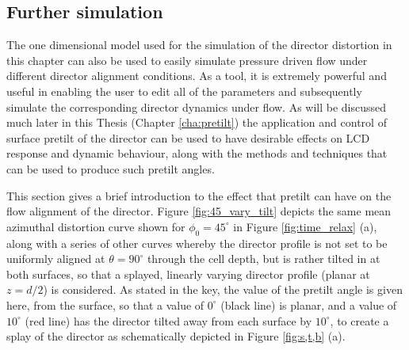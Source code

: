 \subsection{Further simulation}
\label{sec:45_vary_tilt}
The one dimensional model used for the simulation of the director distortion in this chapter can also be used to easily simulate pressure driven flow under different director alignment conditions. As a tool, it is extremely powerful and useful in enabling the user to edit all of the parameters and subsequently simulate the corresponding director dynamics under flow. As will be discussed much later in this Thesis (Chapter \ref{cha:pretilt}) the application and control of surface pretilt of the director can be used to have desirable effects on LCD response and dynamic behaviour, along with the methods and techniques that can be used to produce such pretilt angles. 

This section gives a brief introduction to the effect that pretilt can have on the flow alignment of the director. Figure \ref{fig:45_vary_tilt} depicts the same mean azimuthal distortion curve shown for $\phi_0=45^{\circ}$ in Figure \ref{fig:time_relax} (a), along with a series of other curves whereby the director profile is not set to be uniformly aligned at $\theta=90^{\circ}$ through the cell depth, but is rather tilted in at both surfaces, so that a splayed, linearly varying director profile (planar at $z=d/2$) is considered. As stated in the key, the value of the pretilt angle is given here, from the surface, so that a value of $0^{\circ}$ (black line) is planar, and a value of $10^{\circ}$ (red line) has the director tilted away from each surface by $10^{\circ}$, to create a splay of the director as schematically depicted in Figure \ref{fig:s,t,b} (a).

